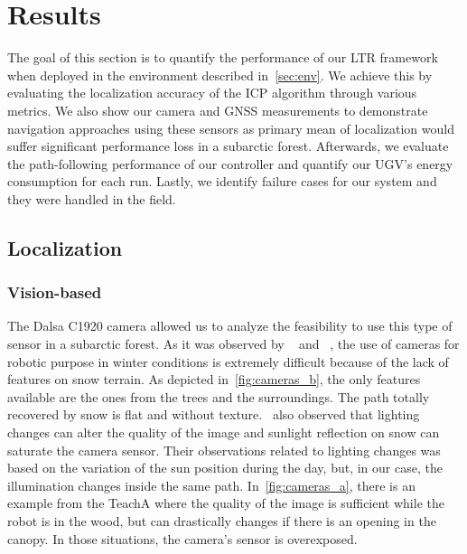 \section{Results}
\label{sec:results}


The goal of this section is to quantify the performance of our \ac{LTR} framework when deployed in the environment described in~\autoref{sec:env}.
We achieve this by evaluating the localization accuracy of the \ac{ICP} algorithm through various metrics.
We also show our camera and \ac{GNSS} measurements to demonstrate navigation approaches using these sensors as primary mean of localization would suffer significant performance loss in a subarctic forest.
Afterwards, we evaluate the path-following performance of our controller and quantify our \ac{UGV}'s energy consumption for each run.
Lastly, we identify failure cases for our system and they were handled in the field.

\subsection{Localization}
\label{sec:res_loc}

\lightlipsum[1]

\subsubsection{Vision-based}
\label{sec:res_vis}

The Dalsa C1920 camera allowed us to analyze the feasibility to use this type of sensor in a subarctic forest. As it was observed by ~\citep{Williams2009} and ~\citep{Paton2017}, the use of cameras for robotic purpose in winter conditions is extremely difficult because of the lack of features on snow terrain. As depicted in~\autoref{fig:cameras_b}, the only features available are the ones from the trees and the surroundings. The path totally recovered by snow is flat and without texture.~\citep{Paton2017} also observed that lighting changes can alter the quality of the image and sunlight reflection on snow can saturate the camera sensor. Their observations related to lighting changes was based on the variation of the sun position during the day, but, in our case, the illumination changes inside the same path. In~\autoref{fig:cameras_a}, there is an example from the TeachA where the quality of the image is sufficient while the robot is in the wood, but can drastically changes if there is an opening in the canopy. In those situations, the camera's sensor is overexposed.

